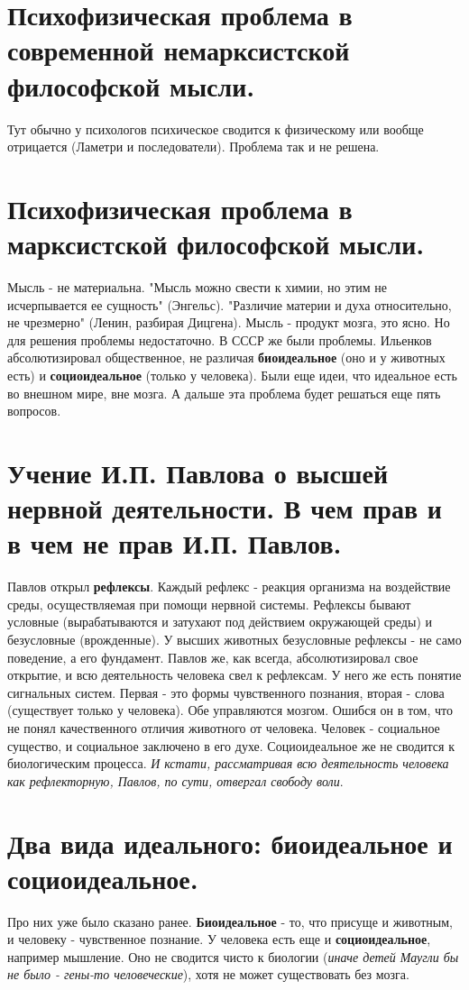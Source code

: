 \section{ Психофизическая проблема в современной немарксистской философской мысли.}
Тут обычно у психологов психическое сводится к физическому или вообще отрицается (Ламетри и последователи). Проблема так и не решена. 

\section{ Психофизическая проблема в марксистской философской мысли.}
Мысль - не материальна. "Мысль можно свести к химии, но этим не исчерпывается ее сущность" (Энгельс). "Различие материи и духа относительно, не чрезмерно" (Ленин, разбирая Дицгена). Мысль - продукт мозга, это ясно. Но для решения проблемы недостаточно. В СССР же были проблемы. Ильенков абсолютизировал общественное, не различая \textbf{биоидеальное} (оно и у животных есть) и \textbf{социоидеальное} (только у человека). Были еще идеи, что идеальное есть во внешном мире, вне мозга.
А дальше эта проблема будет решаться еще пять вопросов.

\section{ Учение И.П. Павлова о высшей нервной деятельности. В чем прав и в чем не прав И.П. Павлов.}
Павлов открыл \textbf{рефлексы}. Каждый рефлекс - реакция организма на воздействие среды, осуществляемая при помощи нервной системы. Рефлексы бывают условные (вырабатываются и затухают под действием окружающей среды) и безусловные (врожденные). У высших животных безусловные рефлексы - не само поведение, а его фундамент. Павлов же, как всегда, абсолютизировал свое открытие, и всю деятельность человека свел к рефлексам. У него же есть понятие сигнальных систем. Первая - это формы чувственного познания, вторая - слова (существует только у человека). Обе управляются мозгом. Ошибся он в том, что не понял качественного отличия животного от человека. Человек - социальное существо, и социальное заключено в его духе. Социоидеальное же не сводится к биологическим процесса. \textit{И кстати, рассматривая всю деятельность человека как рефлекторную, Павлов, по сути, отвергал свободу воли}.

\section{ Два вида идеального: биоидеальное и социоидеальное.}
Про них уже было сказано ранее. \textbf{Биоидеальное} - то, что присуще и животным, и человеку - чувственное познание. У человека есть еще и \textbf{социоидеальное}, например мышление. Оно не сводится чисто к биологии (\textit{иначе детей Маугли бы не было - гены-то человеческие}), хотя не может существовать без мозга.

